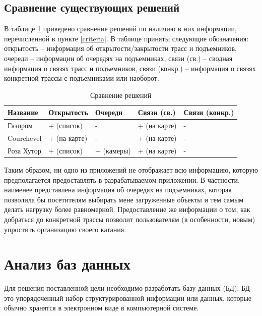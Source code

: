 \subsection{Сравнение существующих решений}

В таблице \ref{tbl:2} приведено сравнение решений по наличию в них информации, перечисленной в пункте \ref{criteria}. В таблице приняты следующие обозначения: открытость -- информация об открытости/закрытости трасс и подъемников, очереди -- информации об очередях на подъемниках, связи (св.) -- сводная информация о связях трасс и подъемников, связи (конкр.) -- информация о связях конкретной трассы с подъемниками или наоборот.

\captionsetup{justification=raggedleft,singlelinecheck=off}
\begin{table}[H]
	\centering
	\caption{Сравнение решений}
	\label{tbl:2}
	\begin{tabular}{|l|l|l|l|l|}
		\hline
		Название & Открытость & Очереди  & Связи (св.) & Связи (конкр.) \\ \hline
		Газпром & + (список) & - & + (на карте) & - \\ \hline
		Courchevel & + (на карте) & - & + (на карте) & - \\ \hline
		Роза Хутор & + (список) & + (камеры) & + (на карте) & - \\ \hline
	\end{tabular}
\end{table}

Таким образом, ни одно из приложений не отображает всю информацию, которую предполагается предоставлять в разрабатываемом приложении. В частности, наименее представлена информация об очередях на подъемниках, которая позволила бы посетителям выбирать мене загруженные объекты и тем самым делать нагрузку более равномерной. Предоставление же информации о том, как добраться до конкретной трассы позволит пользователям (в особенности, новым) упростить организацию своего катания.








\section{Анализ баз данных}

Для решения поставленной цели необходимо разработать базу данных (БД). БД -- это упорядоченный набор структурированной информации или данных, которые обычно хранятся в электронном виде в компьютерной системе\cite{database}.

